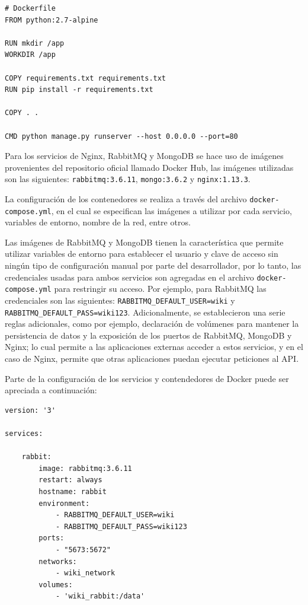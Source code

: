 \begin{minipage}{\linewidth}
\begin{lstlisting}[language=docker,caption={Contenido del archivo Dockerfile para la imagen del API},breaklines=true,label={code:dockerfile}]
# Dockerfile
FROM python:2.7-alpine

RUN mkdir /app
WORKDIR /app

COPY requirements.txt requirements.txt
RUN pip install -r requirements.txt

COPY . .

CMD python manage.py runserver --host 0.0.0.0 --port=80
\end{lstlisting}
\end{minipage}

Para los servicios de Nginx, RabbitMQ y MongoDB se hace uso de imágenes provenientes del repositorio oficial llamado Docker Hub,
las imágenes utilizadas son las siguientes: \texttt{rabbitmq:3.6.11}, \texttt{mongo:3.6.2} y \texttt{nginx:1.13.3}.

La configuración de los contenedores se realiza a través del archivo \texttt{docker-compose.yml}, en el cual se especifican
las imágenes a utilizar por cada servicio, variables de entorno, nombre de la red, entre otros.

Las imágenes de RabbitMQ y MongoDB tienen la característica que permite utilizar variables de entorno para establecer el usuario y clave de acceso sin ningún tipo de configuración manual por parte del desarrollador,
por lo tanto, las credenciales usadas para ambos servicios son agregadas en el archivo \texttt{docker-compose.yml} para restringir su acceso.
Por ejemplo, para RabbitMQ las credenciales son las siguientes: \verb|RABBITMQ_DEFAULT_USER=wiki| y \verb|RABBITMQ_DEFAULT_PASS=wiki123|.
Adicionalmente, se establecieron una serie reglas adicionales, como por ejemplo,
declaración de volúmenes para mantener la persistencia de datos y
la exposición de los puertos de RabbitMQ, MongoDB y Nginx;
lo cual permite a las aplicaciones externas acceder a estos servicios, y en el caso de Nginx, permite que otras aplicaciones puedan ejecutar peticiones al API.

Parte de la configuración de los servicios y contendedores de Docker puede ser apreciada a continuación:

\begin{minipage}{\linewidth}
\begin{lstlisting}[language=docker-compose-2,caption={Declaración de servicios con Docker Compose},breaklines=true,label={code:dockercompose}]
version: '3'

services:

    rabbit:
        image: rabbitmq:3.6.11
        restart: always
        hostname: rabbit
        environment:
            - RABBITMQ_DEFAULT_USER=wiki
            - RABBITMQ_DEFAULT_PASS=wiki123
        ports:
            - "5673:5672"
        networks:
            - wiki_network
        volumes:
            - 'wiki_rabbit:/data'
\end{lstlisting}
\end{minipage}
